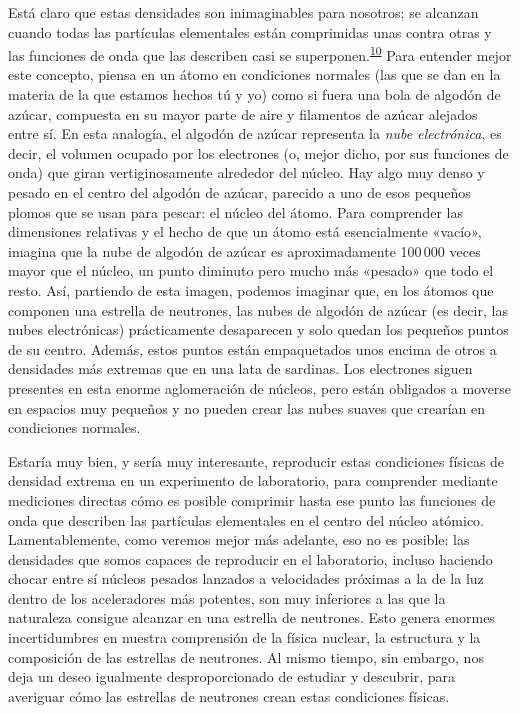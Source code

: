Está claro que estas densidades son inimaginables para nosotros; se alcanzan cuando todas las partículas elementales están comprimidas unas contra otras y las funciones de onda que las describen casi se superponen.\textsuperscript{\hyperlink{note:05-10}{10}} Para entender mejor este concepto, piensa en un átomo en condiciones normales (las que se dan en la materia de la que estamos hechos tú y yo) como si fuera una bola de algodón de azúcar, compuesta en su mayor parte de aire y filamentos de azúcar alejados entre sí. En esta analogía, el algodón de azúcar representa la \emph{nube electrónica}, es decir, el volumen ocupado por los electrones (o, mejor dicho, por sus funciones de onda) que giran vertiginosamente alrededor del núcleo. Hay algo muy denso y pesado en el centro del algodón de azúcar, parecido a uno de esos pequeños plomos que se usan para pescar: el núcleo del átomo. Para comprender las dimensiones relativas y el hecho de que un átomo está esencialmente «vacío», imagina que la nube de algodón de azúcar es aproximadamente 100\,000 veces mayor que el núcleo, un punto diminuto pero mucho más «pesado» que todo el resto. Así, partiendo de esta imagen, podemos imaginar que, en los átomos que componen una estrella de neutrones, las nubes de algodón de azúcar (es decir, las nubes electrónicas) prácticamente desaparecen y solo quedan los pequeños puntos de su centro. Además, estos puntos están empaquetados unos encima de otros a densidades más extremas que en una lata de sardinas. Los electrones siguen presentes en esta enorme aglomeración de núcleos, pero están obligados a moverse en espacios muy pequeños y no pueden crear las nubes suaves que crearían en condiciones normales.

Estaría muy bien, y sería muy interesante, reproducir estas condiciones físicas de densidad extrema en un experimento de laboratorio, para comprender mediante mediciones directas cómo es posible comprimir hasta ese punto las funciones de onda que describen las partículas elementales en el centro del núcleo atómico. Lamentablemente, como veremos mejor más adelante, eso no es posible: las densidades que somos capaces de reproducir en el laboratorio, incluso haciendo chocar entre sí núcleos pesados lanzados a velocidades próximas a la de la luz dentro de los aceleradores más potentes, son muy inferiores a las que la naturaleza consigue alcanzar en una estrella de neutrones. Esto genera enormes incertidumbres en nuestra comprensión de la física nuclear, la estructura y la composición de las estrellas de neutrones. Al mismo tiempo, sin embargo, nos deja un deseo igualmente desproporcionado de estudiar y descubrir, para averiguar cómo las estrellas de neutrones crean estas condiciones físicas.


